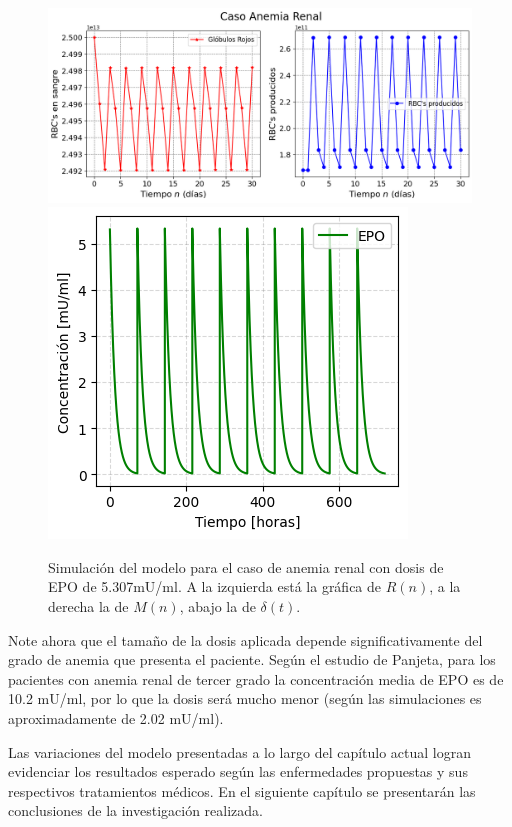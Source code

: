 \begin{figure}[H]
    \centering
    \captionsetup{justification=centering}
    \includegraphics[scale=0.526]{figures/AR21.png}
    \includegraphics[scale=0.8]{figures/AR22.png}
    \caption{Simulación del modelo para el caso de anemia renal con dosis de EPO de 5.307mU/ml. A la izquierda está la gráfica de $R(n)$, a la derecha la de $M(n)$, abajo la de $\delta(t)$.}
    \label{sec:variaciones:fig:Anemia2}
\end{figure}

Note ahora que el tamaño de la dosis aplicada depende significativamente del grado de anemia que presenta el paciente. Según el estudio de Panjeta, para los pacientes con anemia renal de tercer grado la concentración media de EPO es de 10.2 mU/ml, por lo que la dosis será mucho menor (según las simulaciones es aproximadamente de 2.02 mU/ml).

Las variaciones del modelo presentadas a lo largo del capítulo actual logran evidenciar los resultados esperado según las enfermedades propuestas y sus respectivos tratamientos médicos. En el siguiente capítulo se presentarán las conclusiones de la investigación realizada.